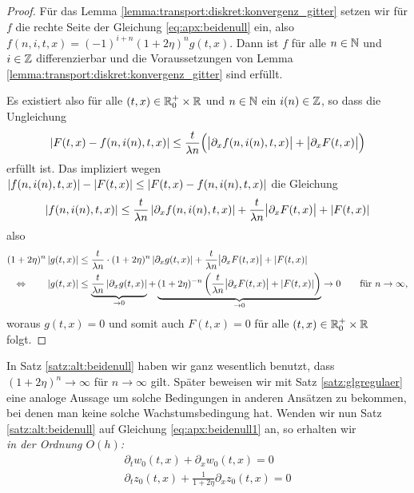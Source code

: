 \begin{proof}
Für das Lemma \ref{lemma:transport:diskret:konvergenz_gitter} setzen wir für $f$ die rechte Seite der Gleichung \eqref{eq:apx:beidenull} ein, also $f(n, i, t, x) = (-1)^{i+n} (1 + 2\eta)^n g(t,x)$.
Dann ist $f$ für alle $n \in \mathbb N$ und $i \in \mathbb Z$ differenzierbar und die Voraussetzungen von Lemma \ref{lemma:transport:diskret:konvergenz_gitter} sind erfüllt.

Es existiert also für alle $(t,x) \in \mathbb R^+_0 \times \mathbb R$ und $n \in \mathbb N$ ein $i(n) \in \mathbb Z$, so dass die Ungleichung
\begin{align}
\left| F(t, x) - f(n, i(n), t, x) \right| \leq \frac {t}{\lambda n} \Bigl(\bigl\lvert \partial_x f(n, i(n), t, x) \bigr\rvert + \bigl\lvert \partial_x F(t, x) \bigr\rvert \Bigr)
\end{align}
erfüllt ist.
Das impliziert wegen $\left| f(n, i(n), t, x) \right| - \left| F(t,x) \right| \leq \left| F(t, x) - f(n, i(n), t, x) \right|$ die Gleichung
\[ \left| f(n, i(n), t, x) \right| \leq \frac {t}{\lambda n} \left| \partial_x f(n, i(n), t, x) \right| +  \frac {t}{\lambda n} \bigl\lvert \partial_x F(t, x) \bigr\rvert + \left| F(t,x) \right| \]
also
\begin{align*}
(1 + 2\eta)^n \left| g(t,x) \right| &\leq \frac{t}{\lambda n} \cdot (1 + 2\eta)^n \left| \partial_x g(t,x) \right| + \frac {t}{\lambda n} \bigl\lvert \partial_x F(t, x) \bigr\rvert + \left| F(t,x) \right|\\
\Leftrightarrow \qquad \left| g(t,x) \right| &\leq \underbrace{\frac{t}{\lambda n} \left| \partial_x g(t,x) \right|}_{\to 0} + \underbrace{(1 + 2 \eta)^{-n} \left( \frac {t}{\lambda n} \bigl\lvert \partial_x F(t, x) \bigr\rvert + \left| F(t,x) \right| \right)}_{\to 0} \to 0 \qquad \text{für $n \to \infty$},
\end{align*}
woraus $g(t,x) = 0$ und somit auch $F(t,x) = 0$ für alle $(t,x) \in \mathbb R^+_0 \times \mathbb R$ folgt.
\end{proof}
In Satz \ref{satz:alt:beidenull} haben wir ganz wesentlich benutzt, dass $(1 + 2 \eta)^n \to \infty$ für $n \to \infty$ gilt.
Später beweisen wir mit Satz \ref{satz:glgregulaer} eine analoge Aussage um solche Bedingungen in anderen Ansätzen zu bekommen, bei denen man keine solche Wachstumsbedingung hat.
Wenden wir nun Satz \ref{satz:alt:beidenull} auf Gleichung \eqref{eq:apx:beidenull1} an, so erhalten wir
\\

\noindent \emph{in der Ordnung $O(h)$:}
\begin{align}
\partial_t w_0(t, x) + \partial_x w_0(t, x) = 0 \label{eq:transport:osz:oh_A}\\
\partial_t z_0(t, x) + \frac {1} {1 + 2\eta} \partial_x z_0(t, x) = 0 \label{eq:transport:osz:oh_B}
\end{align}

